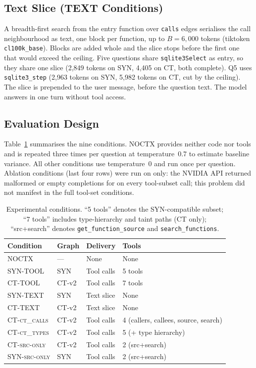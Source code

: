 \subsection{Text Slice (TEXT Conditions)}

A breadth-first search from the entry function over \texttt{calls} edges serialises the call neighbourhood as text, one block per function, up to $B=6{,}000$ tokens (tiktoken \texttt{cl100k\_base}).
Blocks are added whole and the slice stops before the first one that would exceed the ceiling.
Five questions share \texttt{sqlite3Select} as entry, so they share one slice (2{,}849 tokens on SYN, 4{,}405 on CT, both complete).
Q5 uses \texttt{sqlite3\_step} (2{,}963 tokens on SYN, 5{,}982 tokens on CT, cut by the ceiling).
The slice is prepended to the user message, before the question text.
The model answers in one turn without tool access.

\subsection{Evaluation Design}

Table~\ref{tab:conditions} summarises the nine conditions.
\textsc{NOCTX} provides neither code nor tools and is repeated three times
per question at temperature~0.7 to estimate baseline variance.
All other conditions use temperature~0 and run once per question.
Ablation conditions (last four rows) were run on \qwen only: the NVIDIA API
returned malformed or empty completions for \nemotron on every tool-subset
call; this problem did not manifest in the full tool-set conditions.

\begin{table}[h]
\caption{Experimental conditions. ``5 tools'' denotes the SYN-compatible subset;
  ``7 tools'' includes type-hierarchy and taint paths (CT only);
  ``src+search'' denotes \texttt{get\_function\_source} and
  \texttt{search\_functions}.}
\label{tab:conditions}
\small
\begin{tabular}{lllp{3.5cm}}
\toprule
\textbf{Condition} & \textbf{Graph} & \textbf{Delivery} & \textbf{Tools} \\
\midrule
\textsc{NOCTX}           & ---      & None       & None \\
\textsc{SYN-TOOL}         & SYN      & Tool calls & 5 tools \\
\textsc{CT-TOOL}          & CT-v2    & Tool calls & 7 tools \\
\textsc{SYN-TEXT}         & SYN      & Text slice & None \\
\textsc{CT-TEXT}          & CT-v2    & Text slice & None \\
\textsc{CT-ct\_calls}     & CT-v2    & Tool calls & 4 (callers, callees, source, search) \\
\textsc{CT-ct\_types}     & CT-v2    & Tool calls & 5 (+ type hierarchy) \\
\textsc{CT-src-only}      & CT-v2    & Tool calls & 2 (src+search) \\
\textsc{SYN-src-only}     & SYN      & Tool calls & 2 (src+search) \\
\bottomrule
\end{tabular}
\end{table}
